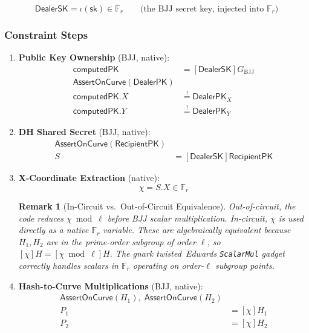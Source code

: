 \documentclass[11pt,a4paper]{article}
\newtheorem{remark}{Remark}[section]
\newcommand{\F}{\mathbb{F}}
\newcommand{\Fr}{\F_r}
\newcommand{\genbjj}{G_{\mathrm{BJJ}}}
\newcommand{\sk}{\mathsf{sk}}
\newcommand{\dhx}{\chi}
\begin{document}
\begin{equation}
  \mathsf{DealerSK} = \iota(\sk) \in \Fr \qquad \text{(the BJJ secret key, injected into $\Fr$)}
  \label{eq:priv-sk}
\end{equation}

\subsubsection{Constraint Steps}

\begin{enumerate}
  \item \textbf{Public Key Ownership} (BJJ, native):
  \begin{align}
    \mathsf{computedPK} &= [\mathsf{DealerSK}]\genbjj \\
    \mathsf{AssertOnCurve}(\mathsf{DealerPK}) & \\
    \mathsf{computedPK}.X &\stackrel{!}{=} \mathsf{DealerPK}_X \\
    \mathsf{computedPK}.Y &\stackrel{!}{=} \mathsf{DealerPK}_Y
  \end{align}

  \item \textbf{DH Shared Secret} (BJJ, native):
  \begin{align}
    \mathsf{AssertOnCurve}(\mathsf{RecipientPK}) & \\
    S &= [\mathsf{DealerSK}]\mathsf{RecipientPK}
  \end{align}

  \item \textbf{X-Coordinate Extraction} (native):
  \begin{equation}
    \dhx = S.X \in \Fr
  \end{equation}

  \begin{remark}[In-Circuit vs.\ Out-of-Circuit Equivalence]
    Out-of-circuit, the code reduces $\dhx \bmod \ell$ before BJJ scalar
    multiplication. In-circuit, $\dhx$ is used directly as a native $\Fr$
    variable. These are algebraically equivalent because $H_1, H_2$ are in the
    prime-order subgroup of order $\ell$, so $[\dhx]H = [\dhx \bmod \ell]H$.
    The gnark twisted~Edwards \texttt{ScalarMul} gadget correctly handles
    scalars in $\Fr$ operating on order-$\ell$ subgroup points.
  \end{remark}

  \item \textbf{Hash-to-Curve Multiplications} (BJJ, native):
  \begin{align}
    \mathsf{AssertOnCurve}(H_1),\; \mathsf{AssertOnCurve}(H_2) & \\
    P_1 &= [\dhx] H_1 \\
    P_2 &= [\dhx] H_2
  \end{align}


\end{enumerate}
\end{document}

